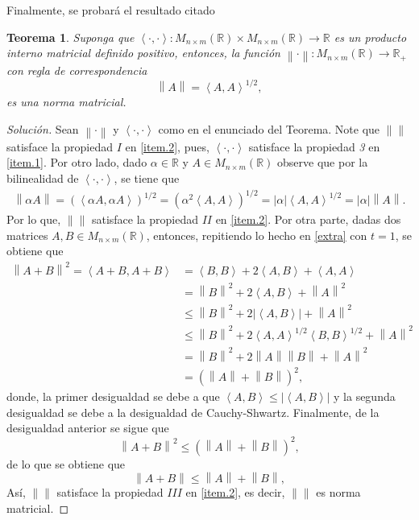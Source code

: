 \documentclass[10.5pt,notitlepage]{article}
\newenvironment{solucion}
  {\begin{proof}[Solución]}
  {\end{proof}}
\newcommand{\RR}{\mathbb{R}}
\newcommand{\abs}[1]{\left\lvert #1 \right\rvert}
\newcommand{\norm}[1]{\left\| #1 \right\|}
\newcommand{\inner}[1]{\left\langle #1 \right\rangle}
\newcommand{\pare}[1]{\left( #1 \right)}
\theoremstyle{plain}
\newtheorem{thm}{Teorema}[section] %
\begin{document}
Finalmente, se probará el resultado citado
\begin{thm}
Suponga que \(\inner{\cdot, \cdot}:M_{n\times m}(\RR)\times M_{n\times m}(\RR)\to \RR\) es un producto interno matricial definido positivo, entonces, la función \(\norm{\cdot}:M_{n\times m}(\RR) \to \RR_{+}\) con regla de correspondencia
\[
\norm{A} = \inner{A,A}^{1/2},
\]
es una norma matricial.
\end{thm}
\begin{solucion}
Sean \(\norm{\cdot}\) y \(\inner{\cdot,\cdot}\) como en el enunciado del Teorema. Note que \(\norm{}\) satisface la propiedad \(I\) en \ref{item.2}, pues, \(\inner{\cdot,\cdot}\) satisface la propiedad \textit{3} en \ref{item.1}. Por otro lado, dado \(\alpha\in \RR\) y \(A \in M_{n \times m}(\RR)\) observe que por la bilinealidad de \(\inner{\cdot,\cdot}\), se tiene que
\begin{align*}
    \norm{\alpha A} = \pare{\inner{\alpha A, \alpha A}}^{1/2} = \pare{\alpha^2 \inner{A, A}}^{1/2} = \abs{\alpha}\inner{A, A}^{1/2} =  \abs{\alpha}\norm{A}.
\end{align*}
Por lo que, \(\norm{}\) satisface la propiedad \(II\) en \ref{item.2}. Por otra parte, dadas dos matrices \(A,B \in M_{n \times m}(\RR)\), entonces, repitiendo lo hecho en \eqref{extra} con \(t = 1\), se obtiene que
\begin{align*}
     \norm{A + B}^2=\inner{A + B, A + B}  &= \inner{B,B} + 2\inner{A,B} + \inner{A,A} \\ 
                          &= \norm{B}^2 + 2\inner{A,B} + \norm{A}^2 \\ 
                          &\leq  \norm{B}^2 + 2\abs{\inner{A,B}}+ \norm{A}^2\\ 
                          &\leq \norm{B}^2 + 2\inner{A,A}^{1/2}\inner{B,B}^{1/2}+ \norm{A}^2\\ 
                          &=  \norm{B}^2 + 2\norm{A}\norm{B} +\norm{A}^2\\
                          &= (\norm{A} + \norm{B})^2,
\end{align*}
donde, la primer desigualdad se debe a que \(\inner{A,B} \leq \abs{\inner{A,B}}\) y la segunda desigualdad se debe a la desigualdad de Cauchy-Shwartz. Finalmente, de la desigualdad anterior se sigue que
\[
\norm{A + B}^2 \leq (\norm{A} + \norm{B})^2,
\]
de lo que se obtiene que 
\[
\norm{A + B} \leq \norm{A} + \norm{B},
\]
Así, \(\norm{}\) satisface la propiedad \(III\) en \ref{item.2}, es decir, \(\norm{}\) es norma matricial.
\end{solucion}
\end{document}
